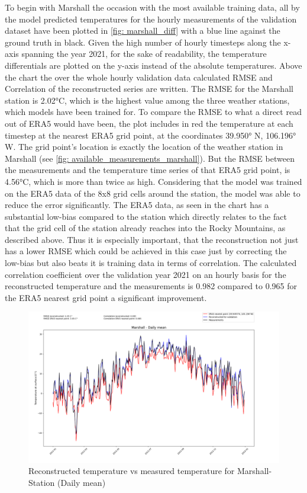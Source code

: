 To begin with Marshall the occasion with the most available training data, all by the model predicted temperatures for the hourly measurements of the validation dataset have been plotted in \autoref{fig: marshall_diff} with a blue line against the ground truth in black. Given the high number of hourly timesteps along the x-axis spanning the year 2021, for the sake of readability, the temperature differentials are plotted on the y-axis instead of the absolute temperatures. Above the chart the over the whole hourly validation data calculated RMSE and Correlation of the reconstructed series are written. The RMSE for the Marshall station is 2.02°C, which is the highest value among the three weather stations, which models have been trained for. To compare the RMSE to what a direct read out of ERA5 would have been, the plot includes in red the temperature at each timestep at the nearest ERA5 grid point, at the coordinates 39.950° N, 106.196° W. The grid point's location is exactly the location of the weather station in Marshall (see \autoref{fig: available_measurements_marshall}). But the RMSE between the measurements and the temperature time series of that ERA5 grid point, is 4.56°C, which is more than twice as high. Considering that the model was trained on the ERA5 data of the 8x8 grid cells around the station, the model was able to reduce the error significantly. The ERA5 data, as seen in the chart has a substantial low-bias compared to the station which directly relates to the fact that the grid cell of the station already reaches into the Rocky Mountains, as described above. Thus it is especially important, that the reconstruction not just has a lower RMSE which could be achieved in this case just by correcting the low-bias but also beats it is training data in terms of correlation. The calculated correlation coefficient over the validation year 2021 on an hourly basis for the reconstructed temperature and the measurements is 0.982 compared to 0.965 for the ERA5 nearest grid point a significant improvement.

\begin{figure}
    \centering
    \includegraphics[width=1.02\textwidth]{resources/images/charts/marshall_eval_grib_final/Marshall - Daily mean.png}
    \caption{Reconstructed temperature vs measured temperature for Marshall-Station (Daily mean)}
    \label{fig: marshall_daily}
\end{figure}

